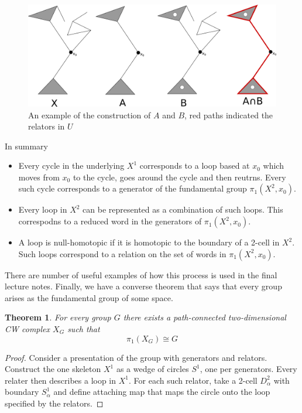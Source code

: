 \documentclass[11pt]{article}
\newcommand{\mdf}[1]{{\color{red} #1}}
\newtheorem{theorem}{Theorem}[section]
\begin{document}
\begin{figure}[ht]
	\centering
	\includegraphics[width=5in]{CWpi1.png}
	\caption{An example of the construction of $A$ and $B$, red paths indicated the relators in $U$}
\end{figure}

In summary

\begin{itemize}
	\item Every \mdf{cycle} in the underlying $X^1$ corresponds to a loop based at $x_0$ which moves from $x_0$ to the cycle, goes around the cycle and then reutrns.
		Every such cycle corresponds to a \mdf{generator} of the fundamental group $\pi_1(X^2, x_0)$.
	\item Every \mdf{loop} in $X^2$ can be represented as a combination of such loops.
		This correspodns to a reduced \mdf{word} in the generators of $\pi_1(X^2, x_0)$.
	\item A loop is \mdf{null-homotopic} if it is homotopic to the boundary of a 2-cell in $X^2$.
		Such loops correspond to a \mdf{relation} on the set of words in $\pi_1(X^2, x_0)$.
\end{itemize}

There are number of useful examples of how this process is used in the final lecture notes.
Finally, we have a converse theorem that says that every group arises as the fundamental group of some space.

\begin{theorem}
For every group $G$ there exists a path-connected two-dimensional CW complex $X_G$ such that
\[
	\pi_1(X_G)\cong G
\]
\end{theorem}

\begin{proof}
Consider a presentation of the group with generators and relators.
Construct the one skeleton $X^1$ as a wedge of circles $S^1$, one per generators.
Every relater then describes a loop in $X^1$.
For each such relator, take a 2-cell $D_\alpha^2$ with boundary $S_\alpha^1$ and define attaching map that maps the circle onto the loop specified by the relators.
\end{proof}
\end{document}
